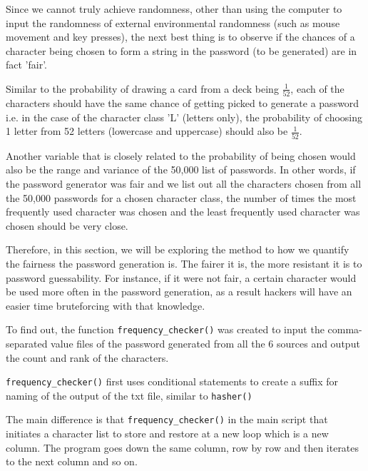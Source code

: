 \documentclass[letterpaper,twocolumn,10pt]{article}
\begin{document}
Since we cannot truly achieve randomness, other than using the computer to input the randomness of external environmental randomness (such as mouse movement and key presses), the next best thing is to observe if the chances of a character being chosen to form a string in the password (to be generated) are in fact 'fair'.

Similar to the probability of drawing a card from a deck being \(\frac{1}{52}\), each of the characters should have the same chance of getting picked to generate a password i.e. in the case of the character class 'L' (letters only), the probability of choosing 1 letter from 52 letters (lowercase and uppercase) should also be \(\frac{1}{52}\).

Another variable that is closely related to the probability of being chosen would also be the range and variance of the 50,000 list of passwords. In other words, if the password generator was fair and we list out all the characters chosen from all the 50,000 passwords for a chosen character class, the number of times the most frequently used character was chosen and the least frequently used character was chosen should be very close.

Therefore, in this section, we will be exploring the method to how we quantify the fairness the password generation is. The fairer it is, the more resistant it is to password guessability. For instance, if it were not fair, a certain character would be used more often in the password generation, as a result hackers will have an easier time bruteforcing with that knowledge.

To find out, the function \lstinline{frequency_checker()} was created to input the comma-separated value files of the password generated from all the 6 sources and output the count and rank of the characters.

\lstinline{frequency_checker()} first uses conditional statements to create a suffix for naming of the output of the txt file, similar to \lstinline{hasher()}

The main difference is that \lstinline{frequency_checker()} in the main script that initiates a character list to store and restore at a new loop which is a new column. The program goes down the same column, row by row and then iterates to the next column and so on.
\end{document}
